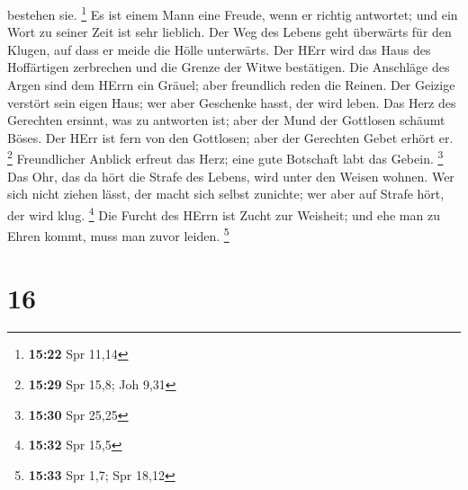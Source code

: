 bestehen sie. \footnote{\textbf{15:22} Spr 11,14}  Es ist
einem Mann eine Freude, wenn er richtig antwortet; und ein Wort zu
seiner Zeit ist sehr lieblich.  Der Weg des Lebens geht
überwärts für den Klugen, auf dass er meide die Hölle unterwärts.
 Der HErr wird das Haus des Hoffärtigen zerbrechen und
die Grenze der Witwe bestätigen.  Die Anschläge des Argen
sind dem HErrn ein Gräuel; aber freundlich reden die Reinen.
 Der Geizige verstört sein eigen Haus; wer aber Geschenke
hasst, der wird leben.  Das Herz des Gerechten ersinnt,
was zu antworten ist; aber der Mund der Gottlosen schäumt Böses.
 Der HErr ist fern von den Gottlosen; aber der Gerechten
Gebet erhört er. \footnote{\textbf{15:29} Spr 15,8; Joh 9,31}
 Freundlicher Anblick erfreut das Herz; eine gute
Botschaft labt das Gebein. \footnote{\textbf{15:30} Spr 25,25}
 Das Ohr, das da hört die Strafe des Lebens, wird unter
den Weisen wohnen.  Wer sich nicht ziehen lässt, der
macht sich selbst zunichte; wer aber auf Strafe hört, der wird klug.
\footnote{\textbf{15:32} Spr 15,5}  Die Furcht des HErrn
ist Zucht zur Weisheit; und ehe man zu Ehren kommt, muss man zuvor
leiden. \footnote{\textbf{15:33} Spr 1,7; Spr 18,12}

\hypertarget{section-15}{%
\section{16}\label{section-15}}

